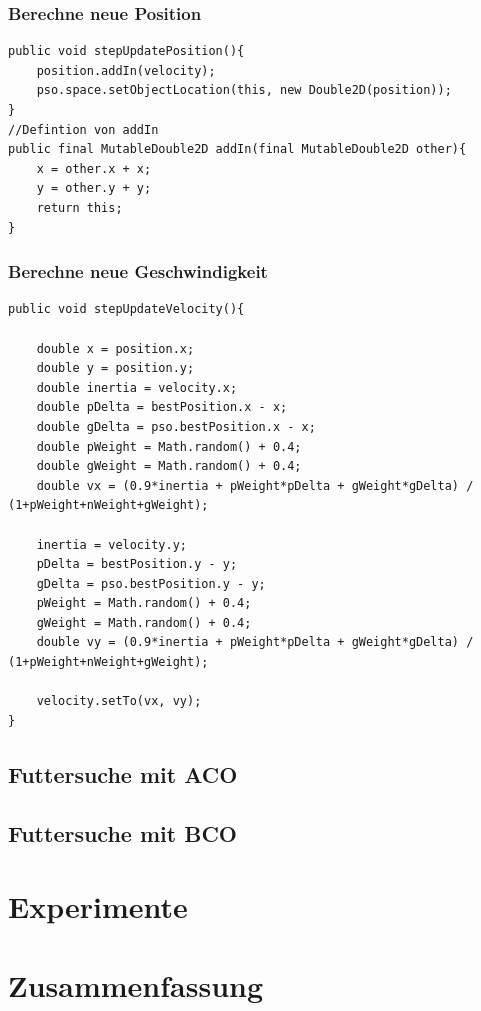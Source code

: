 \documentclass[a4paper, 11pt]{article}
\newcounter{pos}
\begin{document}
\subsubsection{Berechne neue Position}
\begin{lstlisting}[caption= xxxxxxx,label = xxxx]
public void stepUpdatePosition(){
	position.addIn(velocity);
	pso.space.setObjectLocation(this, new Double2D(position));
}
//Defintion von addIn
public final MutableDouble2D addIn(final MutableDouble2D other){
	x = other.x + x;
	y = other.y + y;
	return this;
}
\end{lstlisting}
\subsubsection{Berechne neue Geschwindigkeit}
\begin{lstlisting}[caption= xxxxxxx,label = xxxx]
public void stepUpdateVelocity(){

	double x = position.x;
	double y = position.y;
	double inertia = velocity.x;
	double pDelta = bestPosition.x - x;
	double gDelta = pso.bestPosition.x - x;
	double pWeight = Math.random() + 0.4;
	double gWeight = Math.random() + 0.4;
	double vx = (0.9*inertia + pWeight*pDelta + gWeight*gDelta) / (1+pWeight+nWeight+gWeight);

	inertia = velocity.y;
	pDelta = bestPosition.y - y;
	gDelta = pso.bestPosition.y - y;
	pWeight = Math.random() + 0.4;
	gWeight = Math.random() + 0.4;
	double vy = (0.9*inertia + pWeight*pDelta + gWeight*gDelta) / (1+pWeight+nWeight+gWeight);

	velocity.setTo(vx, vy);         
} 
\end{lstlisting}
\subsection{Futtersuche mit \acs{ACO}}

\subsection{Futtersuche mit \acs{BCO}}
\section{Experimente}
\section{Zusammenfassung}
\end{document}

